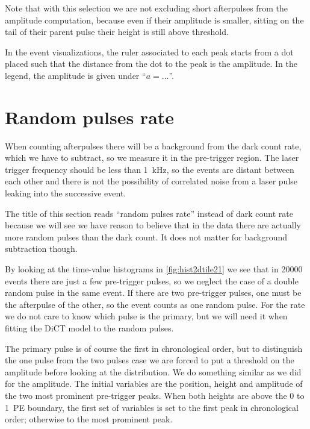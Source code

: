 Note that with this selection we are not excluding short afterpulses from the
amplitude computation, because even if their amplitude is smaller, sitting on
the tail of their parent pulse their height is still above threshold.

In the event visualizations, the ruler associated to each peak starts from a
dot placed such that the distance from the dot to the peak is the amplitude.
In the legend, the amplitude is given under ``$a = \ldots$''.

\section{Random pulses rate}

When counting afterpulses there will be a background from the dark count rate,
which we have to subtract, so we measure it in the pre-trigger region. The
laser trigger frequency should be less than \SI{1}{kHz}, so the events are
distant between each other and there is not the possibility of correlated noise
from a laser pulse leaking into the successive event.


The title of this section reads ``random pulses rate'' instead of dark count
rate because we will see we have reason to believe that in the data there are
actually more random pulses than the dark count. It does not matter for
background subtraction though.

By looking at the time-value histograms in \autoref{fig:hist2dtile21} we see
that in \num{20000} events there are just a few pre-trigger pulses, so we
neglect the case of a double random pulse in the same event. If there are two
pre-trigger pulses, one must be the afterpulse of the other, so the event
counts as one random pulse. For the rate we do not care to know which pulse is
the primary, but we will need it when fitting the DiCT model to the random
pulses.

The primary pulse is of course the first in chronological order, but to
distinguish the one pulse from the two pulses case we are forced to put a
threshold on the amplitude before looking at the distribution. We do something
similar as we did for the amplitude. The initial variables are the position,
height and amplitude of the two most prominent pre-trigger peaks. When both
heights are above the 0 to 1~PE boundary, the first set of variables is set to
the first peak in chronological order; otherwise to the most prominent peak.

